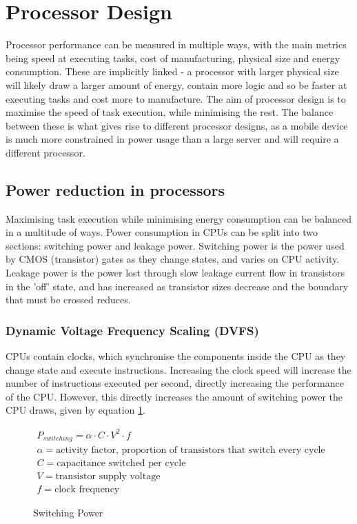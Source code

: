 \section{Processor Design}
\label{sec:processor-design}
Processor performance can be measured in multiple ways, with the main metrics being speed at executing tasks, cost of manufacturing, physical size and energy consumption. These are implicitly linked - a processor with larger physical size will likely draw a larger amount of energy, contain more logic and so be faster at executing tasks and cost more to manufacture. The aim of processor design is to maximise the speed of task execution, while minimising the rest. The balance between these is what gives rise to different processor designs, as a mobile device is much more constrained in power usage than a large server and will require a different processor\cite[chapter~1]{hennessey}.

\subsection{Power reduction in processors}
Maximising task execution while minimising energy consumption can be balanced in a multitude of ways. Power consumption in CPUs can be split into two sections: switching power and leakage power. Switching power is the power used by CMOS (transistor) gates as they change states, and varies on CPU activity. Leakage power is the power lost through slow leakage current flow in transistors in the 'off' state, and has increased as transistor sizes decrease and the boundary that must be crossed reduces.

\subsubsection*{Dynamic Voltage Frequency Scaling (DVFS)}
CPUs contain clocks, which synchronise the components inside the CPU as they change state and execute instructions. Increasing the clock speed will increase the number of instructions executed per second, directly increasing the performance of the CPU. However, this directly increases the amount of switching power the CPU draws, given by equation \ref*{eq:pswitching}\cite[chapter~1]{hennessey}.
\begin{figure}[h!]
    \centering
    \begin{gather*}
        P_{switching} = \alpha \cdot C \cdot V^2 \cdot f \\
        \alpha = \textrm{activity factor, proportion of transistors that switch every cycle} \\
        C = \textrm{capacitance switched per cycle} \\
        V = \textrm{transistor supply voltage} \\
        f = \textrm{clock frequency}
    \end{gather*}
    \caption{Switching Power}
    \label{eq:pswitching}
\end{figure}

